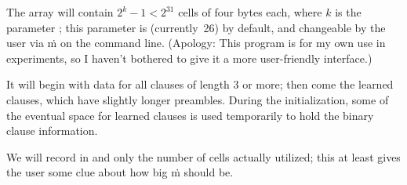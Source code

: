 The  array will contain $2^k-1<2^{31}$ cells of
four bytes each,
where $k$ is the parameter ; this parameter is
 (currently~26) by default, and changeable by the
user
via \.m on the command line. (Apology: This program is for my own use in
experiments, so I haven't bothered to give it a more user-friendly interface.)

It will begin with data for all clauses of length 3 or more;
then come the learned clauses, which have slightly longer preambles.
During the initialization, some of the eventual space for learned
clauses is used temporarily to hold the binary clause information.

We will record in  and  only the number
of cells actually
utilized; this at least gives the user some clue about how big \.m should be.

